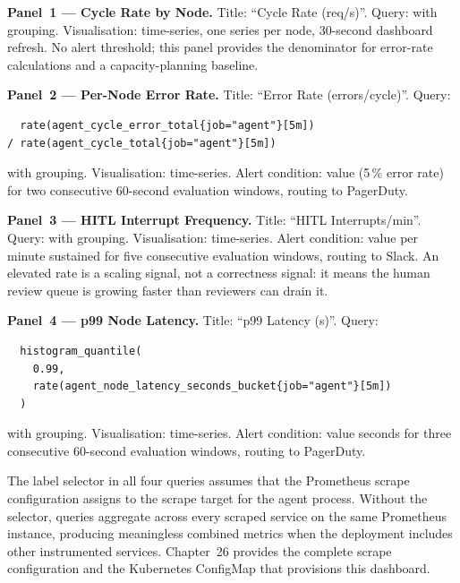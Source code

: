 \textbf{Panel~1 --- Cycle Rate by Node.} Title: ``Cycle Rate (req/s)''.
Query:  with
 grouping. Visualisation: time-series, one
series per node, 30-second dashboard refresh. No alert threshold; this
panel provides the denominator for error-rate calculations and a
capacity-planning baseline.

\textbf{Panel~2 --- Per-Node Error Rate.} Title: ``Error Rate
(errors/cycle)''. Query:
\begin{verbatim}
  rate(agent_cycle_error_total{job="agent"}[5m])
/ rate(agent_cycle_total{job="agent"}[5m])
\end{verbatim}
with  grouping. Visualisation: time-series.
Alert condition: value  (5\,\% error rate) for two
consecutive 60-second evaluation windows, routing to PagerDuty.

\textbf{Panel~3 --- HITL Interrupt Frequency.} Title: ``HITL
Interrupts/min''. Query:
with  grouping. Visualisation: time-series.
Alert condition: value  per minute sustained for five
consecutive evaluation windows, routing to Slack. An elevated rate is
a scaling signal, not a correctness signal: it means the human review
queue is growing faster than reviewers can drain it.

\textbf{Panel~4 --- p99 Node Latency.} Title: ``p99 Latency (s)''.
Query:
\begin{verbatim}
  histogram_quantile(
    0.99,
    rate(agent_node_latency_seconds_bucket{job="agent"}[5m])
  )
\end{verbatim}
with  grouping. Visualisation: time-series.
Alert condition: value  seconds for three consecutive
60-second evaluation windows, routing to PagerDuty.

\begin{notebox}
The  label selector in all four queries assumes that
the Prometheus scrape configuration assigns  to the
scrape target for the agent process. Without the selector, queries
aggregate across every scraped service on the same Prometheus instance,
producing meaningless combined metrics when the deployment includes
other instrumented services. Chapter~26 provides the complete scrape
configuration and the Kubernetes ConfigMap that provisions this
dashboard.
\end{notebox}

